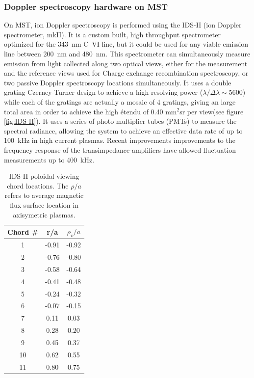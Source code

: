 \subsubsection{Doppler spectroscopy hardware on MST}
On MST, ion Doppler spectroscopy is performed using the IDS-II (ion Doppler spectrometer, mkII). It is a custom built, high throughput spectrometer optimized for the 343~nm C~VI line, but it could be used for any viable emission line between 200~nm and 480~nm. This spectrometer can simultaneously measure emission from light collected along two optical views, either for the measurement and the reference views used for Charge exchange recombination spectroscopy, or two passive Doppler spectroscopy locations simultaneously. It uses a double grating Czerney-Turner design to achieve a high resolving power ($\lambda/\Delta\lambda \sim 5600$) while each of the gratings are actually a mosaic of 4 gratings, giving an large total area in order to achieve the high {\'e}tendu of 0.40 mm$^2$sr per view(see figure \ref{fig:IDS-II}). It uses a series of photo-multiplier tubes (PMTs) to measure the spectral radiance, allowing the system to achieve an effective data rate of up to 100~kHz in high current plasmas\cite{Craig}. Recent improvements improvements to the frequency response of the transimpedance-amplifiers have allowed fluctuation measurements up to 400~kHz\cite{Nishizawa2016}.


\begin{table}[h!]
    \centering
    \begin{tabular}{||c|c|c||}
        Chord \# & r/a & $\rho_v/a$\\
        \hline 
        1 & -0.91 & -0.92 \\
        2 & -0.76 & -0.80 \\
        3 & -0.58 & -0.64 \\
        4 & -0.41 & -0.48 \\
        5 & -0.24 & -0.32 \\
        6 & -0.07 & -0.15 \\
        7 & 0.11 & 0.03 \\
        8 & 0.28 & 0.20 \\
        9 & 0.45 & 0.37 \\
        10 & 0.62 & 0.55 \\
        11 & 0.80 & 0.75
        
    \end{tabular}
    \caption[IDS-II view chord locations]{IDS-II poloidal viewing chord locations. The $\rho/a$ refers to average magnetic flux surface location in axisymetric plasmas.}
    \label{tab:ids_chord_loc}
\end{table}

